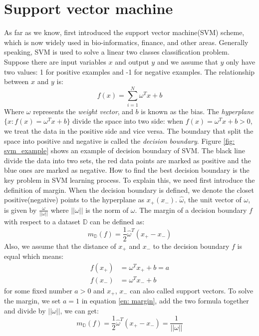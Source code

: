 \section{Support vector machine}
As far as we know,  \cite{boser1992training} first introduced the support vector machine(SVM) scheme,  which is now widely used in bio-informatics,  finance, and other areas. Generally speaking,  SVM is used to solve a linear two classes classification problem. Suppose there are input variables $x$ and output $y$ and we assume that $y$ only have two values:  1 for positive examples and -1 for negative examples. The relationship between $x$ and $y$ is: 
\begin{equation}
f(x)=\sum_{i=1}^{N}\omega^T x +b
\end{equation} 
Where $\omega$ represents the \textit{weight vector},  and $b$ is known as the bias. The \textit{hyperplane} $\{x: f(x)=\omega^Tx+b\}$ divide the space into two side:  when $f(x)=\omega^Tx+b>0$,  we treat the data in the positive side and vice versa. The boundary that split the space into positive and negative is called the \textit{decision boundary}. Figure \ref{fig: svm_example} shows an example of decision boundary of SVM. The black line divide the data into two sets,  the red data points are marked as positive and the blue ones are marked as negative. How to find the best decision boundary is the key problem in SVM learning process. To explain this,  we need first introduce the definition of margin. When the decision boundary is defined,  we denote the closet positive(negative) points to the hyperplane as $x_+(x_-)$. $\hat{\omega}$,  the unit vector of $\omega$,  is given by $\frac{\omega}{||\omega||}$ where $||\omega||$ is the norm of $\omega$. The margin of a decision boundary $f$ with respect to a dataset $\mathbb{D}$ can be defined as: 
\begin{equation}
m_\mathbb{D}(f)=\frac{1}{2}\hat{\omega}^T(x_+-x_-)
\end{equation} 
Also, we assume that the distance of $x_+$ and $x_-$ to the decision boundary $f$ is equal which means: 
\begin{equation}\label{en: margin}
\begin{aligned}
	f(x_+) &=\omega^Tx_++b=a \\
	f(x_-) &=\omega^Tx_-+b
\end{aligned}
\end{equation}
for some fixed number $a>0$ and $x_+$, $x_-$ can also called support vectors. To solve the margin,  we set $a=1$ in equation \ref{en: margin},  add the two formula together and divide by $||\omega||$,  we can get: 
\begin{equation}
	m_\mathbb{D}(f)=\frac{1}{2}\hat{\omega}^T(x_+-x_-)=\frac{1}{||\omega||}
\end{equation}	


